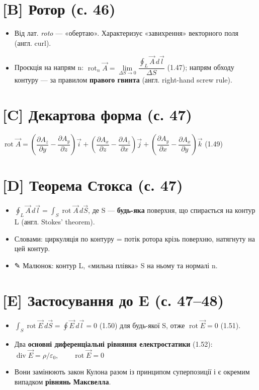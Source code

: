 \documentclass[11pt,a4paper,oneside]{book}
\newcommand{\pen}{{\sffamily\color{accent}✎}}
\begin{document}
\section*{[B] Ротор (с. 46)}
\begin{itemize}
\item Від лат. \textit{roto} — «обертаю». Характеризує «завихрення» векторного поля (англ. curl).
\item Проєкція на напрям n: $\operatorname{rot}_n\vec A = \lim\limits_{\Delta S\to0}\dfrac{\oint_L \vec A\,d\vec l}{\Delta S}$ (1.47); напрям обходу контуру — за правилом \textbf{правого гвинта} (англ. right-hand screw rule).
\end{itemize}

\section*{[C] Декартова форма (с. 47)}
$\operatorname{rot}\vec A = \left(\dfrac{\partial A_z}{\partial y}-\dfrac{\partial A_y}{\partial z}\right)\vec i + \left(\dfrac{\partial A_x}{\partial z}-\dfrac{\partial A_z}{\partial x}\right)\vec j + \left(\dfrac{\partial A_y}{\partial x}-\dfrac{\partial A_x}{\partial y}\right)\vec k$ (1.49)

\section*{[D] Теорема Стокса (с. 47)}
\begin{itemize}
\item $\oint_L \vec A\,d\vec l = \int_S \operatorname{rot}\vec A\,d\vec S$, де S — \textbf{будь-яка} поверхня, що спирається на контур L (англ. Stokes' theorem).
\item Словами: циркуляція по контуру = потік ротора крізь поверхню, натягнуту на цей контур.
\item \pen{} Малюнок: контур L, «мильна плівка» S на ньому та нормалі n.
\end{itemize}

\section*{[E] Застосування до E (с. 47–48)}
\begin{itemize}
\item $\int_S \operatorname{rot}\vec E\,d\vec S = \oint \vec E\,d\vec l = 0$ (1.50) для будь-якої S, отже $\operatorname{rot}\vec E = 0$ (1.51).
\item Два \textbf{основні диференціальні рівняння електростатики} (1.52):
$\operatorname{div}\vec E = \rho/\varepsilon_0,\qquad \operatorname{rot}\vec E = 0$
\item Вони замінюють закон Кулона разом із принципом суперпозиції і є окремим випадком \textbf{рівнянь Максвелла}.
\end{itemize}
\end{document}
